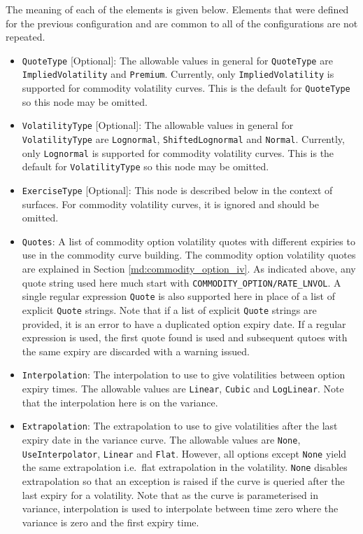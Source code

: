 The meaning of each of the elements is given below. Elements that were defined for the previous configuration and are common to all of the configurations are not repeated.
\begin{itemize}
\item \lstinline!QuoteType! [Optional]: The allowable values in general for \lstinline!QuoteType! are \lstinline!ImpliedVolatility! and \lstinline!Premium!. Currently, only \lstinline!ImpliedVolatility! is supported for commodity volatility curves. This is the default for \lstinline!QuoteType! so this node may be omitted.
\item \lstinline!VolatilityType! [Optional]: The allowable values in general for \lstinline!VolatilityType! are \lstinline!Lognormal!, \lstinline!ShiftedLognormal! and \lstinline!Normal!. Currently, only \lstinline!Lognormal! is supported for commodity volatility curves. This is the default for \lstinline!VolatilityType! so this node may be omitted.
\item \lstinline!ExerciseType! [Optional]: This node is described below in the context of surfaces. For commodity volatility curves, it is ignored and should be omitted.
\item \lstinline!Quotes!: A list of commodity option volatility quotes with different expiries to use in the commodity curve building. The commodity option volatility quotes are explained in Section \ref{md:commodity_option_iv}. As indicated above, any quote string used here much start with \lstinline!COMMODITY_OPTION/RATE_LNVOL!. A single regular expression \lstinline!Quote! is also supported here in place of a list of explicit \lstinline!Quote! strings. Note that if a list of explicit \lstinline!Quote! strings are provided, it is an error to have a duplicated option expiry date. If a regular expression is used, the first quote found is used and subsequent qutoes with the same expiry are discarded with a warning issued.
\item \lstinline!Interpolation!: The interpolation to use to give volatilities between option expiry times. The allowable values are \lstinline!Linear!, \lstinline!Cubic! and \lstinline!LogLinear!. Note that the interpolation here is on the variance.
\item \lstinline!Extrapolation!: The extrapolation to use to give volatilities after the last expiry date in the variance curve. The allowable values are \lstinline!None!, \lstinline!UseInterpolator!, \lstinline!Linear! and \lstinline!Flat!. However, all options except \lstinline!None! yield the same extrapolation i.e.\ flat extrapolation in the volatility. \lstinline!None! disables extrapolation so that an exception is raised if the curve is queried after the last expiry for a volatility. Note that as the curve is parameterised in variance, interpolation is used to interpolate between time zero where the variance is zero and the first expiry time.

\end{itemize}
